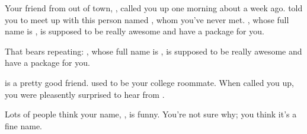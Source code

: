 \documentclass[char]{guildcamp2}
\begin{document}
\name{\cOgre{}}







Your friend from out of town, \cSomeGuy{\intro}, called you up one
morning about a week ago.  \cSomeGuy{} told you to meet up with this
person named \cNPC{}, whom you've never met.  \cNPC{}, whose full name
is \cNPC{\intro}, is supposed to be really awesome and have a package
for you.

That bears repeating: \cNPC{\nick{\informal}}, whose full name is
\cNPC{\full}, is supposed to be really awesome and have a package for
you.

\cSomeGuy{} is a pretty good friend.  \cSomeGuy{\They} used to be your
college roommate.  When \cSomeGuy{\they} called you up, you were
pleasently surprised to hear from \cSomeGuy{\them}.

Lots of people think your name, \me{\intro}, is funny.  You're not
sure why; you think it's a fine name.
\end{document}
